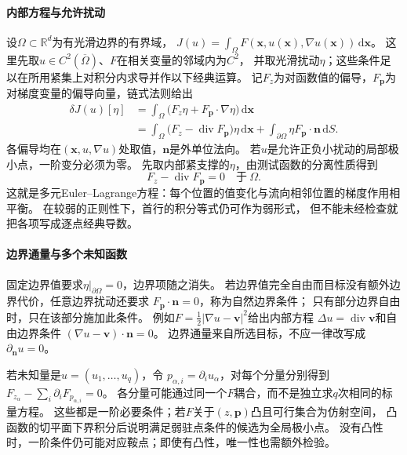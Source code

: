 \paragraph{内部方程与允许扰动}
设$\Omega\subset\mathbb R^d$为有光滑边界的有界域，
$J(u)=\int_\Omega F(\bm x,u(\bm x),\nabla u(\bm x))\,\mathrm d\bm x$。
这里先取$u\in C^2(\overline\Omega)$、$F$在相关变量的邻域内为$C^2$，
并取光滑扰动$\eta$；这些条件足以在所用紧集上对积分内求导并作以下经典运算。
记$F_z$为对函数值的偏导，$F_{\bm p}$为对梯度变量的偏导向量，链式法则给出
\begin{equation}
 \begin{aligned}
 \delta J(u)[\eta]
 &=\int_\Omega\bigl(F_z\eta+F_{\bm p}\cdot\nabla\eta\bigr)\,\mathrm d\bm x\\
 &=\int_\Omega\bigl(F_z-\operatorname{div}F_{\bm p}\bigr)\eta\,\mathrm d\bm x
   +\int_{\partial\Omega}\eta F_{\bm p}\cdot\bm n\,\mathrm dS.
 \end{aligned}
 \label{eq:functional-general-euler-lagrange-variation}
\end{equation}
各偏导均在$(\bm x,u,\nabla u)$处取值，$\bm n$是外单位法向。
若$u$是允许正负小扰动的局部极小点，一阶变分必须为零。
先取内部紧支撑的$\eta$，由测试函数的分离性质得到
\[
 F_z-\operatorname{div}F_{\bm p}=0\quad\text{于}\ \Omega.
\]
这就是多元Euler--Lagrange方程：每个位置的值变化与流向相邻位置的梯度作用相平衡。
在较弱的正则性下，首行的积分等式仍可作为弱形式，
但不能未经检查就把各项写成逐点经典导数。

\paragraph{边界通量与多个未知函数}
固定边界值要求$\eta|_{\partial\Omega}=0$，边界项随之消失。
若边界值完全自由而目标没有额外边界代价，任意边界扰动还要求
$F_{\bm p}\cdot\bm n=0$，称为自然边界条件；
只有部分边界自由时，只在该部分施加此条件。
例如$F=\tfrac12|\nabla u-\bm v|^2$给出内部方程
$\Delta u=\operatorname{div}\bm v$和自由边界条件
$(\nabla u-\bm v)\cdot\bm n=0$。
边界通量来自所选目标，不应一律改写成$\partial_{\bm n}u=0$。

若未知量是$u=(u_1,\ldots,u_q)$，令
$p_{\alpha,i}=\partial_i u_\alpha$，对每个分量分别得到
$F_{z_\alpha}-\sum_i\partial_iF_{p_{\alpha,i}}=0$。
各分量可能通过同一个$F$耦合，而不是独立求$q$次相同的标量方程。
这些都是一阶必要条件；若$F$关于$(z,\bm p)$凸且可行集合为仿射空间，
凸函数的切平面下界积分后说明满足弱驻点条件的候选为全局极小点。
没有凸性时，一阶条件仍可能对应鞍点；即使有凸性，唯一性也需额外检验。

